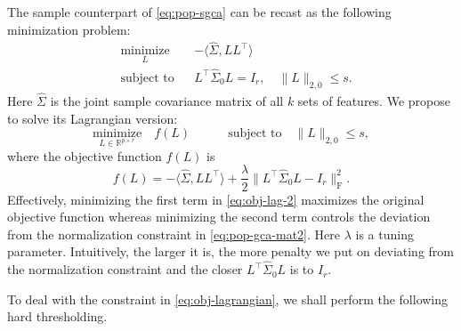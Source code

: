 \documentclass[11pt]{article}
\newcommand{\nb}[1]{\textcolor{orange}{\texttt{[#1]}}}
\newcommand{\gsc}[1]{\textcolor{blue}{\texttt{[#1]}}}
\newcommand{\blue}{\color{black}}
\newcommand{\0}{{\mathbf{0}}}
\begin{document}
The sample counterpart of \eqref{eq:pop-sgca} can be recast as the following minimization problem:
\begin{equation*} 
\begin{aligned}
& \underset{L}{\text{minimize}}
& & -\langle \widehat{\Sigma}, LL^\top \rangle  \\
& \text{subject to}
& & L^\top \widehat\Sigma_0L=I_r,\quad \|L\|_{2,0}\leq s.
\end{aligned}
\end{equation*}
Here $\widehat{\Sigma}$ is the joint sample covariance matrix of all $k$ sets of features.
We propose to solve its Lagrangian version:
\begin{equation}
      \label{eq:obj-lagrangian}
    \underset{{L\in\mathbb{R}^{p\times r}}}{\text{minimize}} \quad f(L)\quad\quad\quad\text{subject to}\quad\|L\|_{2,0}\leq s,
\end{equation}
where the objective function $f(L)$ is 
\begin{equation}
      \label{eq:obj-lag-2}
f(L)=-
   \langle \widehat{\Sigma},LL^\top \rangle +\frac{\lambda}{2}\|L^\top \widehat{\Sigma}_0L-I_r\|_\mathrm{F}^2.
\end{equation}
Effectively, minimizing the first term in \eqref{eq:obj-lag-2} maximizes the original objective function
whereas minimizing the second term controls the deviation from the normalization constraint in \eqref{eq:pop-gca-mat2}. 
Here $\lambda$ is a tuning parameter. 
Intuitively, the larger it is, the more penalty we put on deviating from the normalization constraint and the closer $L^\top \widehat{\Sigma}_0 L$ is to $I_r$. 

To deal with the constraint in \eqref{eq:obj-lagrangian}, we shall perform the following hard thresholding.
\end{document}
